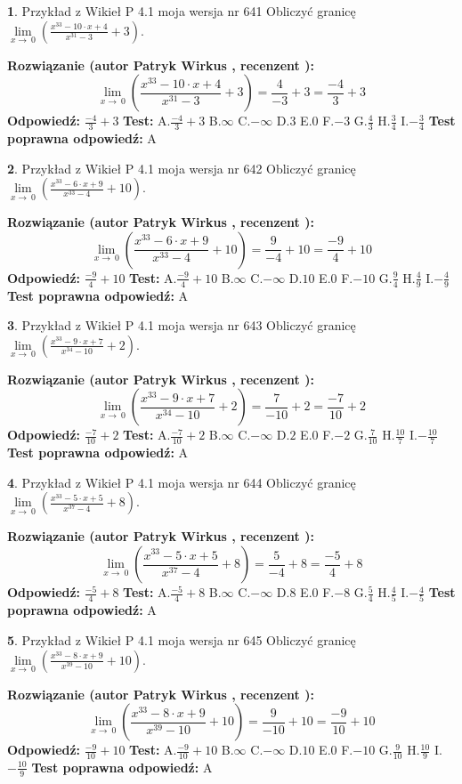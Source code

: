 \documentclass[12pt, a4paper]{article}
\theoremstyle{definition} %
\newtheorem{zad}{}
\newcommand{\zadStart}[1]{\begin{zad}#1\newline}
\newcommand{\zadStop}{\end{zad}}
\newcommand{\rozwStart}[2]{\noindent \textbf{Rozwiązanie (autor #1 , recenzent #2): }\newline}
\newcommand{\rozwStop}{\newline}
\newcommand{\odpStart}{\noindent \textbf{Odpowiedź:}\newline}
\newcommand{\odpStop}{\newline}
\newcommand{\testStart}{\noindent \textbf{Test:}\newline}
\newcommand{\testStop}{\newline}
\newcommand{\kluczStart}{\noindent \textbf{Test poprawna odpowiedź:}\newline}
\newcommand{\kluczStop}{\newline}
\begin{document}
\zadStart{Przykład z Wikieł P 4.1 moja wersja nr 641}
Obliczyć granicę $\lim\limits_{x\to\ 0}(\frac{x^{33}-10 \cdot x +4}{x^{31}-3}+3)$.
\zadStop
\rozwStart{Patryk Wirkus}{}
$$\lim\limits_{x\to\ 0}(\frac{x^{33}-10 \cdot x +4}{x^{31}-3}+3)=\frac{4}{-3}+3=\frac{-4}{3}+3$$
\rozwStop
\odpStart
$\frac{-4}{3}+3$
\odpStop
\testStart
A.$\frac{-4}{3}+3$
B.$\infty$
C.$-\infty$
D.$3$
E.$0$
F.$-3$
G.$\frac{4}{3}$
H.$\frac{3}{4}$
I.$-\frac{3}{4}$
\testStop
\kluczStart
A
\kluczStop



\zadStart{Przykład z Wikieł P 4.1 moja wersja nr 642}
Obliczyć granicę $\lim\limits_{x\to\ 0}(\frac{x^{33}-6 \cdot x +9}{x^{33}-4}+10)$.
\zadStop
\rozwStart{Patryk Wirkus}{}
$$\lim\limits_{x\to\ 0}(\frac{x^{33}-6 \cdot x +9}{x^{33}-4}+10)=\frac{9}{-4}+10=\frac{-9}{4}+10$$
\rozwStop
\odpStart
$\frac{-9}{4}+10$
\odpStop
\testStart
A.$\frac{-9}{4}+10$
B.$\infty$
C.$-\infty$
D.$10$
E.$0$
F.$-10$
G.$\frac{9}{4}$
H.$\frac{4}{9}$
I.$-\frac{4}{9}$
\testStop
\kluczStart
A
\kluczStop



\zadStart{Przykład z Wikieł P 4.1 moja wersja nr 643}
Obliczyć granicę $\lim\limits_{x\to\ 0}(\frac{x^{33}-9 \cdot x +7}{x^{34}-10}+2)$.
\zadStop
\rozwStart{Patryk Wirkus}{}
$$\lim\limits_{x\to\ 0}(\frac{x^{33}-9 \cdot x +7}{x^{34}-10}+2)=\frac{7}{-10}+2=\frac{-7}{10}+2$$
\rozwStop
\odpStart
$\frac{-7}{10}+2$
\odpStop
\testStart
A.$\frac{-7}{10}+2$
B.$\infty$
C.$-\infty$
D.$2$
E.$0$
F.$-2$
G.$\frac{7}{10}$
H.$\frac{10}{7}$
I.$-\frac{10}{7}$
\testStop
\kluczStart
A
\kluczStop



\zadStart{Przykład z Wikieł P 4.1 moja wersja nr 644}
Obliczyć granicę $\lim\limits_{x\to\ 0}(\frac{x^{33}-5 \cdot x +5}{x^{37}-4}+8)$.
\zadStop
\rozwStart{Patryk Wirkus}{}
$$\lim\limits_{x\to\ 0}(\frac{x^{33}-5 \cdot x +5}{x^{37}-4}+8)=\frac{5}{-4}+8=\frac{-5}{4}+8$$
\rozwStop
\odpStart
$\frac{-5}{4}+8$
\odpStop
\testStart
A.$\frac{-5}{4}+8$
B.$\infty$
C.$-\infty$
D.$8$
E.$0$
F.$-8$
G.$\frac{5}{4}$
H.$\frac{4}{5}$
I.$-\frac{4}{5}$
\testStop
\kluczStart
A
\kluczStop



\zadStart{Przykład z Wikieł P 4.1 moja wersja nr 645}
Obliczyć granicę $\lim\limits_{x\to\ 0}(\frac{x^{33}-8 \cdot x +9}{x^{39}-10}+10)$.
\zadStop
\rozwStart{Patryk Wirkus}{}
$$\lim\limits_{x\to\ 0}(\frac{x^{33}-8 \cdot x +9}{x^{39}-10}+10)=\frac{9}{-10}+10=\frac{-9}{10}+10$$
\rozwStop
\odpStart
$\frac{-9}{10}+10$
\odpStop
\testStart
A.$\frac{-9}{10}+10$
B.$\infty$
C.$-\infty$
D.$10$
E.$0$
F.$-10$
G.$\frac{9}{10}$
H.$\frac{10}{9}$
I.$-\frac{10}{9}$
\testStop
\kluczStart
A
\kluczStop
\end{document}
